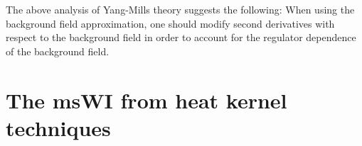 \documentclass[11pt]{book}
\newcommand{\overbar}[1]{\mkern 1.5mu\overline{\mkern-1.5mu#1\mkern-1.5mu}\mkern 1.5mu}
\numberwithin{equation}{chapter}
\begin{document}
\begin{appendices}
The above analysis of Yang-Mills theory suggests the following:
When using the background field approximation, one should modify
second derivatives with respect to the background field in order to account
for the regulator dependence of the background field.



\chapter[Modified Ward identities from heat kernel techniques]{The msWI from heat kernel techniques}
\label{app:msWItraces}


\end{appendices}
\end{document}
